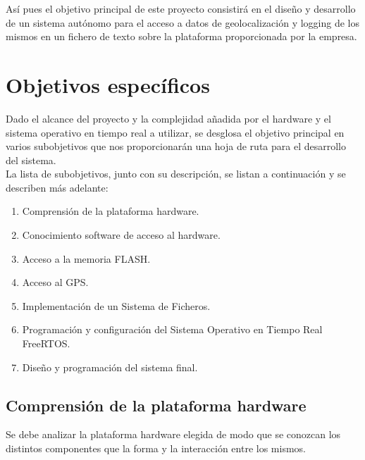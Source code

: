 Así pues el objetivo principal de este proyecto consistirá en el diseño y desarrollo de un sistema autónomo para el acceso a datos de geolocalización y logging de los mismos en un fichero de texto sobre la plataforma proporcionada por la empresa.\\

\section{Objetivos específicos}
\label{sec:objetivosEspecificos}
Dado el alcance del proyecto y la complejidad añadida por el hardware y el sistema operativo en tiempo real a utilizar, se desglosa el objetivo principal en varios subobjetivos que nos proporcionarán una hoja de ruta para el desarrollo del sistema.\\

La lista de subobjetivos, junto con su descripción, se listan a continuación y se describen más adelante:

\begin{enumerate}
\item Comprensión de la plataforma hardware.
\item Conocimiento software de acceso al hardware.                                                     
\item Acceso a la memoria FLASH.                                                                                      
\item Acceso al GPS.                                                                                             
\item Implementación de un Sistema de Ficheros.                                                  
\item Programación y configuración del Sistema Operativo en Tiempo Real FreeRTOS.                                                                                                              
\item Diseño y programación del sistema final.\\
\end{enumerate}

\subsection{Comprensión de la plataforma hardware}
Se debe analizar la plataforma hardware elegida de modo que se conozcan los distintos componentes que la forma y la interacción entre los mismos.\\

